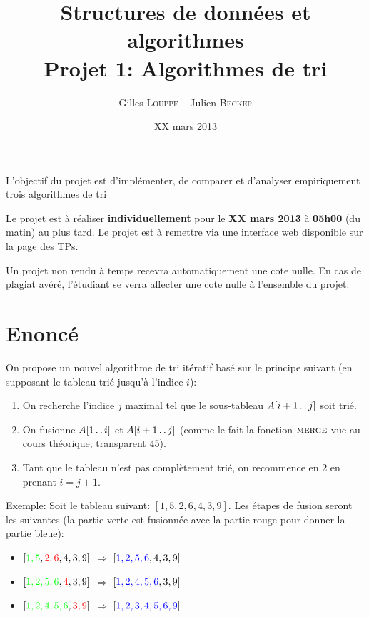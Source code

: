 \documentclass[a4paper,10pt]{article}
\title{
    \textbf{Structures de données et algorithmes}\\
    Projet 1: Algorithmes de tri
}
\author{Gilles \textsc{Louppe} -- Julien \textsc{Becker}}
\date{XX mars 2013}
\begin{document}
\maketitle

L'objectif du projet est d'implémenter, de comparer et d'analyser empiriquement
trois algorithmes de tri

Le projet est à réaliser {\bf individuellement} pour le {\bf XX mars 2013} à
{\bf 05h00} (du matin) au plus tard. Le projet est à remettre via une interface
web disponible sur \href{http://www.montefiore.ulg.ac.be/~glouppe/2012-2013/students.info0902.php}{la page des TPs}.

Un projet non rendu à temps recevra automatiquement une cote nulle. En cas de
plagiat avéré, l'étudiant se verra affecter une cote nulle à l'ensemble du
projet.

\section{Enoncé}

On propose un nouvel algorithme de tri itératif basé sur le principe suivant (en supposant le tableau trié jusqu'à l'indice $i$):
\begin{enumerate}
\item On recherche l'indice $j$ maximal tel que le sous-tableau $A[i+1\mathinner{\ldotp\ldotp} j]$ soit trié.
\item On fusionne $A[1\mathinner{\ldotp\ldotp} i]$ et $A[i+1 \mathinner{\ldotp\ldotp} j]$ (comme le fait la fonction $\textnormal{\scshape merge}$ vue au cours théorique, transparent 45).
\item Tant que le tableau n'est pas complètement trié, on recommence en 2 en prenant $i=j+1$.
\end{enumerate}

\bigskip

Exemple: Soit le tableau suivant: $[1,5,2,6,4,3,9]$. Les étapes de fusion seront les suivantes (la partie verte est fusionnée avec la partie rouge pour donner la partie bleue):
\begin{itemize}
\item $[{\color{green} 1,5},{\color{red} 2,6},4,3,9]$ $\Rightarrow$ $[{\color{blue} 1,2,5,6},4,3,9]$
\item $[{\color{green} 1,2,5,6},{\color{red}4},3,9]$ $\Rightarrow$ $[{\color{blue} 1,2,4,5,6},3,9]$
\item $[{\color{green} 1,2,4,5,6},{\color{red} 3,9}]$ $\Rightarrow$ $[{\color{blue} 1,2,3,4,5,6,9}]$
\end{itemize}
\end{document}
